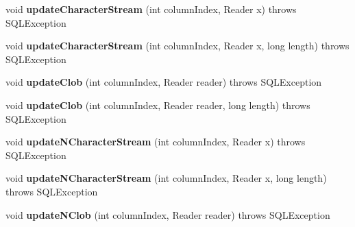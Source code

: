 \begin{DoxyCompactItemize}
void {\bfseries update\+Character\+Stream} (int column\+Index, Reader x)  throws S\+Q\+L\+Exception 
\item 
\mbox{\label{classcom_1_1mysql_1_1cj_1_1jdbc_1_1result_1_1_updatable_result_set_a153e59a30b1f1c677dc79d0acf166e60}} 
void {\bfseries update\+Character\+Stream} (int column\+Index, Reader x, long length)  throws S\+Q\+L\+Exception 
\item 
\mbox{\label{classcom_1_1mysql_1_1cj_1_1jdbc_1_1result_1_1_updatable_result_set_a3f3ba97c6780a2b1b9e1830e08109938}} 
void {\bfseries update\+Clob} (int column\+Index, Reader reader)  throws S\+Q\+L\+Exception 
\item 
\mbox{\label{classcom_1_1mysql_1_1cj_1_1jdbc_1_1result_1_1_updatable_result_set_a0c2416b43741ac338e25cccd4ad633a4}} 
void {\bfseries update\+Clob} (int column\+Index, Reader reader, long length)  throws S\+Q\+L\+Exception 
\item 
\mbox{\label{classcom_1_1mysql_1_1cj_1_1jdbc_1_1result_1_1_updatable_result_set_ab0a18f810c2995106d77faf4c072cd04}} 
void {\bfseries update\+N\+Character\+Stream} (int column\+Index, Reader x)  throws S\+Q\+L\+Exception 
\item 
\mbox{\label{classcom_1_1mysql_1_1cj_1_1jdbc_1_1result_1_1_updatable_result_set_aa685d17d86468a2cf83b5b8a3a5f5fa0}} 
void {\bfseries update\+N\+Character\+Stream} (int column\+Index, Reader x, long length)  throws S\+Q\+L\+Exception 
\item 
\mbox{\label{classcom_1_1mysql_1_1cj_1_1jdbc_1_1result_1_1_updatable_result_set_a3a83a1062b84f836a53c501da8e41069}} 
void {\bfseries update\+N\+Clob} (int column\+Index, Reader reader)  throws S\+Q\+L\+Exception 
\item 
\mbox{\label{classcom_1_1mysql_1_1cj_1_1jdbc_1_1result_1_1_updatable_result_set_a81dd90de41f3f0c4c05c30062383e12a}} 

\end{DoxyCompactItemize}
